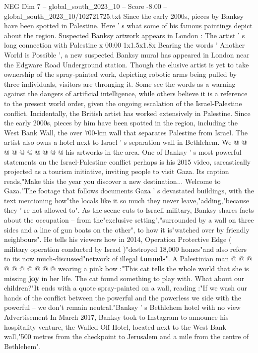 \begin{textsample}{NEG Dim 7 – global\_south\_2023\_10 – Score -8.00 – global\_south\_2023\_10/102721725.txt}  \label{ex:f7_neg_313}
Since the early 2000s, pieces by Banksy have been spotted in Palestine.
Here ' s what some of his famous paintings depict about the region.
Suspected Banksy artwork appears in London : The artist ' s long connection with Palestine x 00:00 1x1.5x1.8x Bearing the words ' Another World is Possible ', a new suspected Banksy mural has appeared in London near the Edgware Road Underground station.
Though the elusive artist is yet to take ownership of the spray-painted work, depicting robotic arms being pulled by three individuals, visitors are thronging it.
Some see the words as a warning against the dangers of artificial intelligence, while others believe it is a reference to the present world order, given the ongoing escalation of the Israel-Palestine conflict.
Incidentally, the British artist has worked extensively in Palestine.
Since the early 2000s, pieces by him have been spotted in the region, including the West Bank Wall, the over 700-km wall that separates Palestine from Israel.
The artist also owns a hotel next to Israel ' s separation wall in Bethlehem.
We @ @ @ @ @ @ @ @ @ @ his artworks in the area.
One of Banksy ' s most powerful statements on the Israel-Palestine conflict perhaps is his 2015 video, sarcastically projected as a tourism initiative, inviting people to visit Gaza.
Its caption reads,"Make this the year you discover a new destination...
Welcome to Gaza."The footage that follows documents Gaza ' s devastated buildings, with the text mentioning how"the locals like it so much they never leave,"adding,"because they ' re not allowed to".
As the scene cuts to Israeli military, Banksy shares facts about the occupation -- from the"exclusive setting","surrounded by a wall on three sides and a line of gun boats on the other", to how it is"watched over by friendly neighbours".
He tells his viewers how in 2014, Operation Protective Edge ( military operation conducted by Israel )"destroyed 18,000 homes"and also refers to its now much-discussed"network of illegal \textbf{tunnels}".
A Palestinian man @ @ @ @ @ @ @ @ @ @ wearing a pink bow :"This cat tells the whole world that she is missing \textbf{joy} in her life.
The cat found something to play with.
What about our children?"It ends with a quote spray-painted on a wall, reading :"If we wash our hands of the conflict between the powerful and the powerless we side with the powerful -- we don't remain neutral."Banksy ' s Bethlehem hotel with no view Advertisement In March 2017, Banksy took to Instagram to announce his hospitality venture, the Walled Off Hotel, located next to the West Bank wall,"500 metres from the checkpoint to Jerusalem and a mile from the centre of Bethlehem".

\end{textsample}
